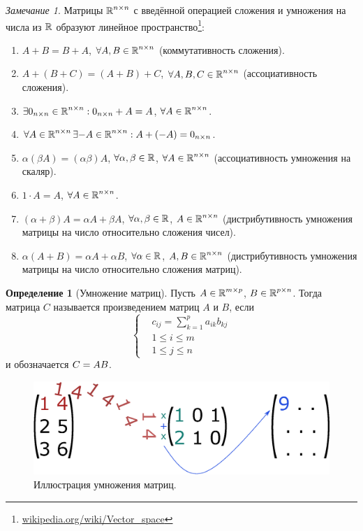 \documentclass[a4paper,12pt]{article}
\theoremstyle{definition}
\newtheorem{definition}{Определение}[section]
\theoremstyle{remark}
\theoremstyle{remark}
\newtheorem*{remark}{Замечание}
\begin{document}
  \begin{remark}
    Матрицы $\operatorname{\mathbb R}^{n \times n}$ с введённой операцией сложения и умножения на числа из $\operatorname{\mathbb R}$ образуют линейное пространство\footnote{\href{https://en.wikipedia.org/wiki/Vector\_space}{wikipedia.org/wiki/Vector\_space}}:
    \begin{enumerate}
      \item $A + B = B + A$, $\forall A, B \in \operatorname{\mathbb R}^{n \times n}$ (коммутативность сложения).
      \item $A + (B + C) = (A + B) + C$, $\forall A, B, C \in \operatorname{\mathbb R}^{n \times n}$ (ассоциативность сложения).
      \item $\exists 0_{n\times n} \in \operatorname{\mathbb R}^{n \times n}: 0_{n\times n} + A = A$, $\forall A \hm\in \RR^{n \times n}$.
      \item $\forall A \in \operatorname{\mathbb R}^{n \times n} \exists {-A} \in \operatorname{\mathbb R}^{n \times n}: A + ({-A}) = 0_{n\times n}$.
      \item $\alpha (\beta A) = (\alpha \beta) A$, $\forall \alpha, \beta \in \operatorname{\mathbb R}$, $\forall A \hm\in \RR^{n \times n}$ (ассоциативность умножения на скаляр).
      \item $1 \cdot A = A$, $\forall A \in \operatorname{\mathbb R}^{n \times n}$.
      \item $(\alpha + \beta) A = \alpha A + \beta A$, $\forall \alpha, \beta \hm\in \RR$, $A \hm\in \RR^{n \times n}$ (дистрибутивность умножения матрицы на число относительно сложения чисел).
      \item $\alpha (A + B) = \alpha A + \alpha B$, $\forall \alpha \hm\in \RR$, $A, B \hm\in \RR^{n \times n}$ (дистрибутивность умножения матрицы на число относительно сложения матриц).
    \end{enumerate}
  \end{remark}
  
  \begin{definition}[Умножение матриц]
    Пусть $A \hm\in \RR^{m \times p}$, $B \hm\in \RR^{p \times n}$.
    Тогда матрица $C$ называется произведением матриц $A$ и $B$, если
    \[
      \left\{
        \begin{aligned}
          &c_{ij} = \sum_{k = 1}^p a_{ik} b_{kj}\\
          &1 \leq i \leq m\\
          &1 \leq j \leq n
        \end{aligned}
      \right.
    \]
    и обозначается $C \hm= AB$.
  \end{definition}

  \begin{figure}[h]
    \centering
    
    \includegraphics[width=0.5\columnwidth]{matrix-multiplication}
    
    \caption{Иллюстрация умножения матриц.}
    \label{fig:matrix-multiplication}
  \end{figure}
  
\end{document}
